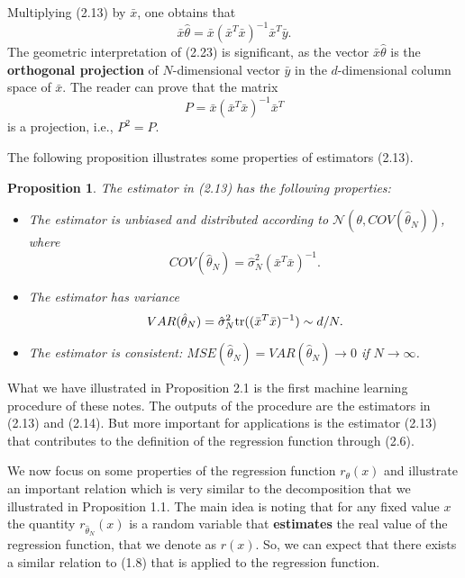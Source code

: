 \documentclass{report}
\newtheorem{proposition}{Proposition}[chapter]
\begin{document}
Multiplying (2.13) by $\bar{x}$, one obtains that
\begin{equation}
\bar{x}\hat{\theta} = \bar{x}(\bar{x}^T\bar{x})^{-1}\bar{x}^T\bar{y}.
\end{equation}
The geometric interpretation of (2.23) is significant, as the vector $\bar{x}\hat{\theta}$ is the \textbf{orthogonal projection} of $N$-dimensional vector $\bar{y}$ in the $d$-dimensional column space of $\bar{x}$. The reader can prove that the matrix
\begin{equation}
P = \bar{x}(\bar{x}^T\bar{x})^{-1}\bar{x}^T
\end{equation}
is a projection, i.e., $P^2 = P$.

The following proposition illustrates some properties of estimators (2.13).

\begin{proposition}
The estimator in (2.13) has the following properties:
\begin{itemize}
\item The estimator is unbiased and distributed according to $\mathcal{N}(\theta, COV(\hat{\theta}_N))$, where 
\begin{equation}
COV(\hat{\theta}_N) = \hat{\sigma}_N^2(\bar{x}^T\bar{x})^{-1}.
\end{equation}
\item The estimator has variance
\begin{equation}
VAR(\hat{\theta}_N) = \hat{\sigma}^2_N\textup{tr}((\bar{x}^T\bar{x})^{-1}) \sim d/N.
\end{equation}
\item The estimator is consistent: $MSE(\hat{\theta}_N) = VAR(\hat{\theta}_N) \to 0$ if $N \to \infty$. 
\end{itemize}
\end{proposition}

What we have illustrated in Proposition 2.1 is the first machine learning procedure of these notes. The outputs of the procedure are the estimators in (2.13) and (2.14). But more important for applications is the estimator (2.13) that contributes to the definition of the regression function through (2.6).

We now focus on some properties of the regression function $r_\theta(x)$ and illustrate an important relation which is very similar to the decomposition that we illustrated in Proposition 1.1. The main idea is noting that for any fixed value $x$ the quantity $r_{\hat{\theta}_N}(x)$ is a random variable that \textbf{estimates} the real value of the regression function, that we denote as $r(x)$. So, we can expect that there exists a similar relation to (1.8) that is applied to the regression function.
\end{document}
